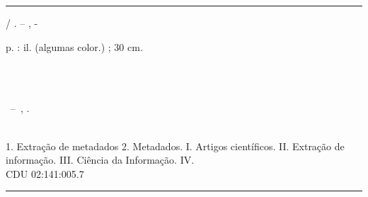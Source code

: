 \documentclass[
	12pt,               %
	openright,          %
	oneside,            %
	a4paper,            %
	english,            %
	brazil              %
	]{abntex2}
\begin{document}
\frenchspacing 


\imprimircapa

\imprimirfolhaderosto*


%
%     
\begin{fichacatalografica}
	\vspace*{\fill}                 %
	\hrule                          %
	\begin{center}                  %
	\begin{minipage}[c]{12.5cm}     %
	
	\imprimirautor
	
	\hspace{0.5cm} \imprimirtitulo  / \imprimirautor. --
	\imprimirlocal, \imprimirdata-
	
	\hspace{0.5cm} \pageref{LastPage} p. : il. (algumas color.) ; 30 cm.\\
	
	\hspace{0.5cm} 
	
	\imprimirorientadorRotulo~\imprimirorientador\\
	\imprimircoorientadorRotulo~\imprimircoorientador\\
	
	\hspace{0.5cm}
	\parbox[t]{\textwidth}{\imprimirtipotrabalho~--~\imprimirinstituicao,
	\imprimirdata.}\\
	
	\hspace{0.5cm}
		1. Extração de metadados
		2. Metadados.
		I. Artigos científicos.
		II. Extração de informação.
		III. Ciência da Informação.
		IV. \imprimirtitulo\\            
	
	\hspace{8.75cm} CDU 02:141:005.7\\
	
	\end{minipage}
	\end{center}
	\hrule
\end{fichacatalografica}
\end{document}
